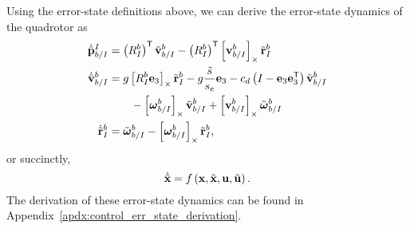 Using the error-state definitions above, we can derive the error-state dynamics
of the quadrotor as
\begin{align}
        \dot{\tilde{\boldsymbol{\mathrm{p}}}}_{b/I}^{I} &= \left(R_{I}^{b}\right)^{\mathsf{T}}
          \tilde{\boldsymbol{\mathrm{v}}}_{b/I}^{b} - \left(R_{I}^{b}\right)^{\mathsf{T}}
          \left[ \boldsymbol{\mathrm{v}}_{b/I}^{b} \right]_{\times} \tilde{\boldsymbol{\mathrm{r}}}_I^b \nonumber\\
        \dot{\tilde{\boldsymbol{\mathrm{v}}}}_{b/I}^{b} &= g\left[ R_I^b
          \boldsymbol{\mathrm{e}}_3 \right]_{\times} \tilde{\boldsymbol{\mathrm{r}}}_I^b -g\frac{\tilde{s}}{s_e}\boldsymbol{\mathrm{e}}_3
          -c_d \left( I - \boldsymbol{\mathrm{e}}_3 \boldsymbol{\mathrm{e}}_3^{\mathsf{T}} \right)
          \tilde{\boldsymbol{\mathrm{v}}}_{b/I}^b \nonumber \\
                                         & \qquad - \left[ \boldsymbol{\mathrm{\omega}}_{b/I}^b \right]_{\times}
          \tilde{\boldsymbol{\mathrm{v}}}_{b/I}^b + \left[ \boldsymbol{\mathrm{v}}_{b/I}^b \right]_{\times}
          \tilde{\boldsymbol{\mathrm{\omega}}}_{b/I}^b \nonumber \\
          \dot{\tilde{\boldsymbol{\mathrm{r}}}}_{I}^{b} &= \tilde{\boldsymbol{\mathrm{\omega}}}_{b/I}^{b} -
        \left[ \boldsymbol{\mathrm{\omega}}_{b/I}^{b}  \right]_{\times} \tilde{\boldsymbol{\mathrm{r}}}_I^b,
	\label{eq:error_state_dynamics}
\end{align}
or succinctly,
\begin{equation}
  \dot{\tilde{\boldsymbol{\mathrm{x}}}} = f\left(\boldsymbol{\mathrm{x}}, \tilde{\boldsymbol{\mathrm{x}}}, \boldsymbol{\mathrm{u}}, \tilde{\boldsymbol{\mathrm{u}}}\right).
\end{equation}
The derivation of these error-state dynamics can be found in
Appendix~\ref{apdx:control_err_state_derivation}.


